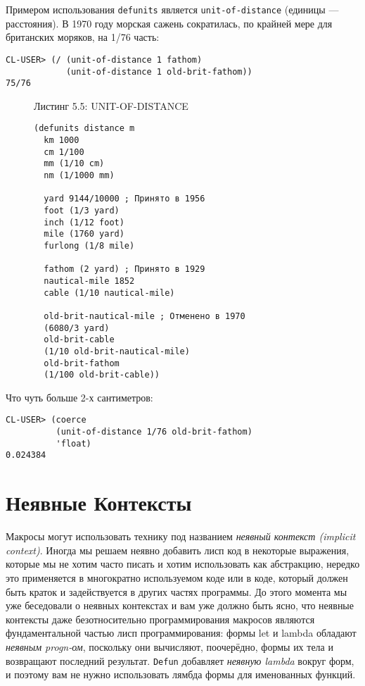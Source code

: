 Примером использования \verb"defunits" является \verb"unit-of-distance" (единицы --- расстояния). В 1970 году морская сажень сократилась, по крайней мере для британских моряков, на 1/76 часть:

\begin{verbatim}
CL-USER> (/ (unit-of-distance 1 fathom)
            (unit-of-distance 1 old-brit-fathom))
75/76
\end{verbatim}

\begin{figure}Листинг 5.5: UNIT-OF-DISTANCE\label{listing_5.5}
\listbegin
\begin{verbatim}
(defunits distance m
  km 1000
  cm 1/100
  mm (1/10 cm)
  nm (1/1000 mm)

  yard 9144/10000 ; Принято в 1956
  foot (1/3 yard)
  inch (1/12 foot)
  mile (1760 yard)
  furlong (1/8 mile)

  fathom (2 yard) ; Принято в 1929
  nautical-mile 1852
  cable (1/10 nautical-mile)
  
  old-brit-nautical-mile ; Отменено в 1970
  (6080/3 yard)
  old-brit-cable
  (1/10 old-brit-nautical-mile)
  old-brit-fathom
  (1/100 old-brit-cable))
\end{verbatim}
\listend
\end{figure}

Что чуть больше 2-х сантиметров:

\begin{verbatim}
CL-USER> (coerce
          (unit-of-distance 1/76 old-brit-fathom)
          'float)
0.024384
\end{verbatim}

\section{Неявные Контексты}\label{section_implicit_contexts}

Макросы могут использовать технику под названием \emph{неявный контекст (implicit context)}. Иногда мы решаем неявно добавить лисп код в некоторые выражения, которые мы не хотим часто писать и хотим использовать как абстракцию, нередко это применяется в многократно используемом коде или в коде, который должен быть краток и задействуется в других частях программы. До этого момента мы уже беседовали о неявных контекстах и вам уже должно быть ясно, что неявные контексты даже безотносительно программирования макросов являются фундаментальной частью лисп программирования: формы let и lambda обладают \emph{неявным progn-ом}, поскольку они вычисляют, поочерёдно, формы их тела и возвращают последний результат. \verb"Defun" добавляет \emph{неявную lambda} вокруг форм, и поэтому вам не нужно использовать лямбда формы для именованных функций.

